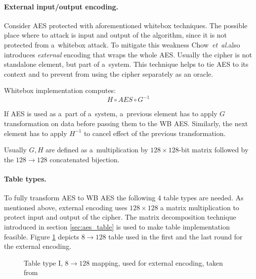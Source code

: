 \documentclass[11pt,oneside,final]{fithesis2}
\newcommand{\eal}{\emph{et~al.}}
\begin{document}
    \paragraph*{External input/output encoding.}
    Consider AES protected with aforementioned whitebox techniques. The possible place where to attack is input and output of the algorithm, since it is not protected 
    from a~whitebox attack. To mitigate this weakness Chow~\eal also introduces \emph{external} encoding that wraps the whole AES. Usually the cipher is not standalone element,
    but part of a~system. This technique helps to tie AES to its context and to prevent from using the cipher separately as an oracle.

    Whitebox implementation computes:
    \begin{equation}
	H \circ AES \circ G^{-1}
    \end{equation}
    
    If AES is used as a~part of a~system, a~previous element has to apply $G$ transformation on data before passing them to the WB AES. Similarly, the next element has to apply
    $H^{-1}$ to cancel effect of the previous transformation. 
    
    Usually $G, H$ are defined as a~multiplication by $128\times128$-bit matrix followed by the $128 \rightarrow 128$ concatenated bijection. 

    
    \paragraph*{Table types.} To fully transform AES to WB AES the following 4 table types are needed.
    As mentioned above, external encoding uses $128\times128$ a matrix multiplication to protect input and output of the cipher. 
    The matrix decomposition technique introduced in section \ref{sec:aes_table} is used to make table implementation feasible. Figure \ref{fig:aes_t1} depicts
    $8\rightarrow128$ table used in the first and the last round for the external encoding.

    \begin{figure}[!htb]
    \begin{center}
    \leavevmode
    \centerline{}
    \end{center}
    \caption{Table type I, $8\rightarrow128$ mapping, used for external encoding, taken from \citep{wyseurPhd}}
    \label{fig:aes_t1}
    \end{figure}
    
\end{document}
